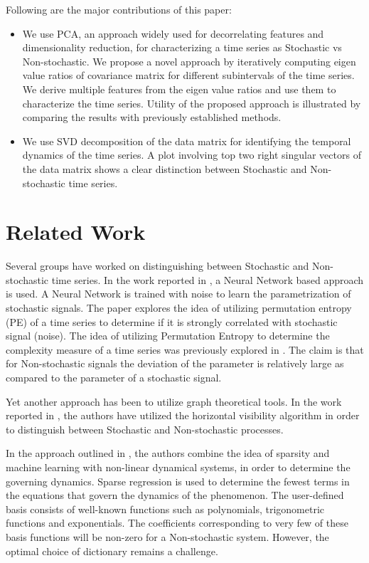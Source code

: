 \documentclass[10pt,conference]{IEEEtran}
\begin{document}
Following are the major contributions of this paper:
\begin{itemize}
  \item We use PCA, an approach widely used for decorrelating features and dimensionality reduction, for characterizing a time series as Stochastic vs Non-stochastic. We propose a novel approach by iteratively computing eigen value ratios  of covariance matrix for different subintervals of the time series. We  derive multiple features from the eigen value ratios and use them to characterize the time series. Utility of the proposed approach is illustrated by comparing the results with previously established methods.
  \item We use SVD decomposition of the data matrix for identifying the temporal dynamics of the time series. A plot involving top two right singular vectors of the data matrix shows a clear distinction between Stochastic and Non-stochastic time series.
\end{itemize}
\section{Related Work}
Several groups have worked on distinguishing between Stochastic and Non-stochastic time series. In the work reported in \cite{Boaretto2021}, a Neural Network based approach is used. A Neural Network is trained with noise to learn the parametrization of stochastic signals. The paper explores the idea of utilizing permutation entropy (PE) of a time series to determine if it is strongly correlated with stochastic signal (noise).  The idea of utilizing Permutation Entropy to determine the complexity measure of a time series was previously explored in \cite{Bandt2002}. The claim is that for Non-stochastic signals the deviation of the parameter is relatively large as compared to the parameter of a stochastic signal.

Yet another approach has been to utilize graph theoretical tools. In the work reported in \cite{lacasa2010}, the authors have utilized
the horizontal visibility algorithm in order to distinguish between Stochastic and Non-stochastic processes.

In the approach outlined in \cite{Brunton2016}, the authors combine the idea of sparsity and machine learning with non-linear dynamical systems, in order to determine the governing dynamics. Sparse regression is used to determine the fewest terms in the equations that govern the dynamics of the phenomenon. The user-defined basis consists of well-known functions such as polynomials, trigonometric functions and exponentials. The coefficients corresponding to very few of these basis functions will be non-zero for a Non-stochastic system. However, the optimal choice of dictionary remains a challenge.
\end{document}
